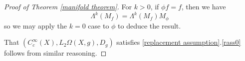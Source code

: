 \begin{proof}[Proof of Theorem \ref{manifold theorem}]
        For $k > 0$, if $\phi f = f$, then we have
        \begin{equation*}
            \Lambda^k(M_f) = \Lambda^k(M_f)M_{\phi}
        \end{equation*}
        so we may apply the $k=0$ case to $\phi$ to deduce the result. 
        
        That $(C_c^\infty(X),L_2\Omega(X,g),D_g)$ satisfies
        \ref{replacement assumption}.\eqref{rass0} follows from similar reasoning.        
    \end{proof}

